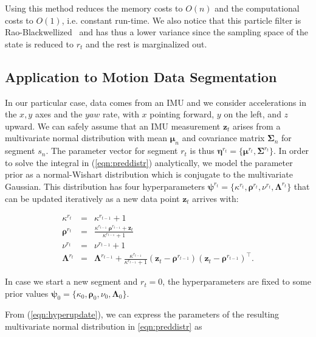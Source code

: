 Using this method reduces the memory costs to $O(n)$ and the computational costs
to $O(1)$, i.e. constant run-time. We also notice that this particle filter is
Rao-Blackwellized~\cite{casella96rao} and has thus a lower variance since the
sampling space of the state is reduced to $r_t$ and the rest is marginalized out.

\subsection{Application to Motion Data Segmentation}
In our particular case, data comes from an IMU and we consider accelerations in
the $x,y$ axes and the $yaw$ rate, with $x$ pointing forward, $y$ on the left,
and $z$ upward. We can safely assume that an IMU measurement $\mathbf{z}_t$
arises from a multivariate normal distribution with mean $\boldsymbol{\mu}_n$
and covariance matrix $\boldsymbol{\Sigma}_n$ for segment $s_n$. The parameter
vector for segment $r_t$ is thus $\boldsymbol{\eta}^{r_{t}}=
\{\boldsymbol{\mu}^{r_{t}},\boldsymbol{\Sigma}^{r_{t}}\}$. In order to solve
the integral in (\ref{eqn:preddistr}) analytically, we model the parameter prior
as a normal-Wishart distribution which is conjugate to the multivariate
Gaussian. This distribution has four hyperparameters
$\boldsymbol{\psi}^{r_{t}}=\{\kappa^{r_{t}},\boldsymbol{\rho}^{r_{t}},
\nu^{r_{t}},\boldsymbol{\Lambda}^{r_{t}}\}$ that can be updated iteratively
as a new data point $\mathbf{z}_t$ arrives with:

\begin{eqnarray}
\label{eqn:hyperupdate}
\kappa^{r_{t}}&=&\kappa^{r_{t-1}}+1\nonumber\\
\boldsymbol{\rho}^{r_{t}}&=&\frac{\kappa^{r_{t-1}}\;
\boldsymbol{\rho}^{r_{t-1}}+\mathbf{z}_t}{\kappa^{r_{t-1}}+1}\nonumber\\
\nu^{r_{t}}&=&\nu^{r_{t-1}}+1\nonumber\\
\boldsymbol{\Lambda}^{r_{t}}&=&\boldsymbol{\Lambda}^{r_{t-1}}+
\frac{\kappa^{r_{t-1}}}{\kappa^{r_{t-1}} + 1}
(\mathbf{z}_t - \boldsymbol{\rho}^{r_{t-1}})
(\mathbf{z}_t - \boldsymbol{\rho}^{r_{t-1}})^\intercal.
\end{eqnarray}

In case we start a new segment and $r_t=0$, the hyperparameters are fixed to
some prior values $\boldsymbol{\psi}_0=\{\kappa_0,\boldsymbol{\rho}_0,\nu_0,
\boldsymbol{\Lambda}_0\}$.

From (\ref{eqn:hyperupdate}), we can express the parameters of the resulting
multivariate normal distribution in \eqref{eqn:preddistr} as


